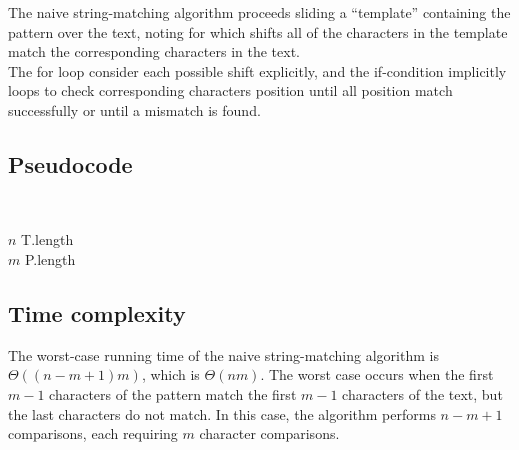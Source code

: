 \documentclass[11pt]{article}
\begin{document}
            The naive string-matching algorithm proceeds sliding a ``template'' containing the pattern over the text, noting for which shifts
            all of the characters in the template match the corresponding characters in the text. \\
            The for loop consider each possible shift explicitly, and the if-condition implicitly loops to check corresponding characters
            position until all position match successfully or until a mismatch is found.

        \subsection{Pseudocode} \label{subsec:naive_pseudocode}

            \begin{algorithm}[H] \label{alg:naive_string_matching_algorithm}
                \SetAlgoLined
                \vspace{0.5em}
                 \\
                \vspace{0.5em}

                    $n$ \leftarrow T.length\; \\
                    $m$ \leftarrow P.length\; \\

            \end{algorithm}

        \subsection{Time complexity} \label{subsec:naive_time_complexity}

            The worst-case running time of the naive string-matching algorithm is $\Theta((n - m + 1)m)$, which is $\Theta(nm)$.
            The worst case occurs when the first $m - 1$ characters of the pattern match the first $m - 1$ characters of the text, but the last characters do not match.
            In this case, the algorithm performs $n - m + 1$ comparisons, each requiring $m$ character comparisons. \\
\end{document}

